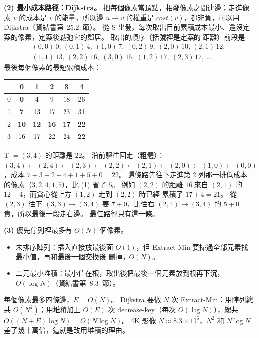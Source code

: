 \begin{pastsoln}
\textbf{(2) 最小成本路徑：Dijkstra。} 把每個像素當頂點，相鄰像素之間連邊；走進像素 $v$ 的成本是 $v$
的能量，所以邊 $u \to v$ 的權重是 $\mathit{cost}(v)$，都非負，可以用 Dijkstra（資結書第~25.2~節）。 從
S 出發，每次取出目前累積成本最小、還沒定案的像素，定案後鬆弛它的鄰居。 取出的順序（括號裡是定案的
距離）前段是
\begin{gather*}
(0,0)\,0,\ (0,1)\,4,\ (1,0)\,7,\ (0,2)\,9,\ (2,0)\,10,\ (2,1)\,12,\\
(1,1)\,13,\ (2,2)\,16,\ (3,0)\,16,\ (1,2)\,17,\ (2,3)\,17,\ \ldots
\end{gather*}
最後每個像素的最短累積成本：
\begin{center}
\begin{tabular}{c|ccccc}
 & 0 & 1 & 2 & 3 & 4 \\ \hline
0 & \textbf{0} & 4 & 9 & 18 & 26 \\
1 & \textbf{7} & 13 & 17 & 23 & 31 \\
2 & \textbf{10} & \textbf{12} & \textbf{16} & \textbf{17} & \textbf{22} \\
3 & 16 & 17 & 22 & 24 & \textbf{22} \\
\end{tabular}
\end{center}
T $= (3,4)$ 的距離是 $22$。 沿前驅往回走（粗體）：$(3,4) \leftarrow (2,4) \leftarrow (2,3) \leftarrow
(2,2) \leftarrow (2,1) \leftarrow (2,0) \leftarrow (1,0) \leftarrow (0,0)$，成本
$7 + 3 + 2 + 4 + 1 + 5 + 0 = 22$。 這條路先往下走進第 2 列那一排低成本的像素（$3, 2, 4, 1, 5$），比 (1)
省了 $5$。 例如 $(2,2)$ 的距離 $16$ 來自 $(2,1)$ 的 $12 + 4$，而貪心從上方 $(1,2)$ 走到 $(2,2)$ 時已經
累積了 $17 + 4 = 21$。 從 $(2,3)$ 往下 $(3,3) \to (3,4)$ 要 $7 + 0$，比往右 $(2,4) \to (3,4)$ 的 $5 + 0$
貴，所以最後一段走右邊。 最佳路徑只有這一條。

\textbf{(3)} 優先佇列裡最多有 $O(N)$ 個像素。
\begin{itemize}
\item 未排序陣列：插入直接放最後面 $O(1)$，但 Extract-Min 要掃過全部元素找最小值，再和最後一個交換後
刪掉，$O(N)$。
\item 二元最小堆積：最小值在根，取出後把最後一個元素放到根再下沉，$O(\log N)$（資結書第~8.3~節）。
\end{itemize}
每個像素最多四條邊，$E = O(N)$。 Dijkstra 要做 $N$ 次 Extract-Min：用陣列總共 $O(N^2)$；用堆積加上
$O(E)$ 次 decrease-key（每次 $O(\log N)$），總共 $O((N + E)\log N) = O(N \log N)$。 4K 影像
$N \approx 8.3 \times 10^6$，$N^2$ 和 $N \log N$ 差了幾十萬倍，這就是改用堆積的理由。
\end{pastsoln}
